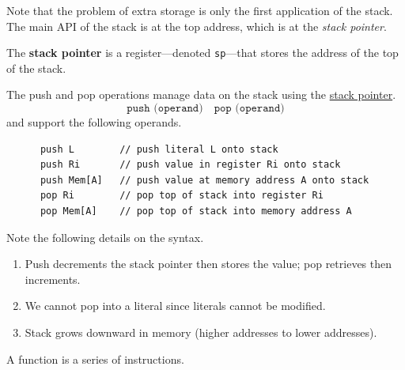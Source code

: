   Note that the problem of extra storage is only the first application of the stack. The main API of the stack is at the top address, which is at the \textit{stack pointer}. 

  \begin{definition}
    \label{def:stack-pointer}
    The \textbf{stack pointer} is a register---denoted \texttt{sp}---that stores the address of the top of the stack. 
  \end{definition}

  \begin{definition}
    \label{def:push-pop}
    The push and pop operations manage data on the stack using the \hyperref[def:stack-pointer]{stack pointer}.
    \begin{equation}
      \texttt{push (operand)} \quad \texttt{pop (operand)}
    \end{equation}
    and support the following operands.
    \begin{lstlisting}
      push L        // push literal L onto stack
      push Ri       // push value in register Ri onto stack
      push Mem[A]   // push value at memory address A onto stack
      pop Ri        // pop top of stack into register Ri
      pop Mem[A]    // pop top of stack into memory address A
    \end{lstlisting}
    Note the following details on the syntax.
    \begin{enumerate}
      \item Push decrements the stack pointer then stores the value; pop retrieves then increments.
      \item We cannot pop into a literal since literals cannot be modified.
      \item Stack grows downward in memory (higher addresses to lower addresses).
    \end{enumerate}
  \end{definition}

  \begin{definition}[Function]
    \label{def:function}
    A function is a series of instructions. 
  \end{definition}


